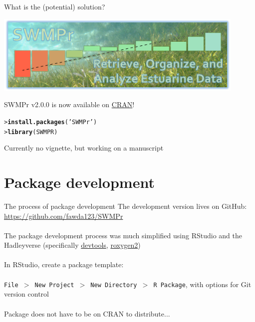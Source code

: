 \documentclass[serif]{beamer}\usepackage[]{graphicx}\usepackage[]{color}
\makeatletter
\newcommand{\hlstr}[1]{\textcolor[rgb]{0.192,0.494,0.8}{#1}}%
\newcommand{\hlstd}[1]{\textcolor[rgb]{0.345,0.345,0.345}{#1}}%
\newcommand{\hlkwd}[1]{\textcolor[rgb]{0.737,0.353,0.396}{\textbf{#1}}}%
\newenvironment{kframe}{%
 \def\at@end@of@kframe{}%
 \ifinner\ifhmode%
  \def\at@end@of@kframe{\end{minipage}}%
  \begin{minipage}{\columnwidth}%
 \fi\fi%
 \def\FrameCommand##1{\hskip\@totalleftmargin \hskip-\fboxsep
 \colorbox{shadecolor}{##1}\hskip-\fboxsep
     \hskip-\linewidth \hskip-\@totalleftmargin \hskip\columnwidth}%
 \MakeFramed {\advance\hsize-\width
   \@totalleftmargin\z@ \linewidth\hsize
   \@setminipage}}%
 {\par\unskip\endMakeFramed%
 \at@end@of@kframe}
\newenvironment{knitrout}{}{} %
\makeatother
\begin{document}
\begin{frame}[fragile]{What is the (potential) solution?}
\centerline{\includegraphics[width = 0.9\textwidth]{fig/swmpr_logo.png}}
\vspace{0.1in}
SWMPr v2.0.0 is now available on \href{http://cran.r-project.org/web/packages/SWMPr/index.html}{CRAN}!
\begin{knitrout}
\color{fgcolor}\begin{kframe}
\begin{alltt}
\hlstd{> }\hlkwd{install.packages}\hlstd{(}\hlstr{'SWMPr'}\hlstd{)}
\hlstd{> }\hlkwd{library}\hlstd{(SWMPR)}
\end{alltt}
\end{kframe}
\end{knitrout}
Currently no vignette, but working on a manuscript
\end{frame}

\section{Package development}

\begin{frame}[fragile]{The process of package development}
The development version lives on GitHub: \href{https://github.com/fawda123/SWMPr}{https://github.com/fawda123/SWMPr} \\~\\
The package development process was much simplified using RStudio and the Hadleyverse (specifically \href{http://cran.r-project.org/web/packages/devtools/index.html}{devtools}, \href{http://cran.r-project.org/web/packages/roxygen2/index.html}{roxygen2}) \\~\\
In RStudio, create a package template: \\~\\
\texttt{File $>$ New Project $>$ New Directory $>$ R Package}, with options for Git version control \\~\\
Package does not have to be on CRAN to distribute...
\end{frame}
\end{document}
